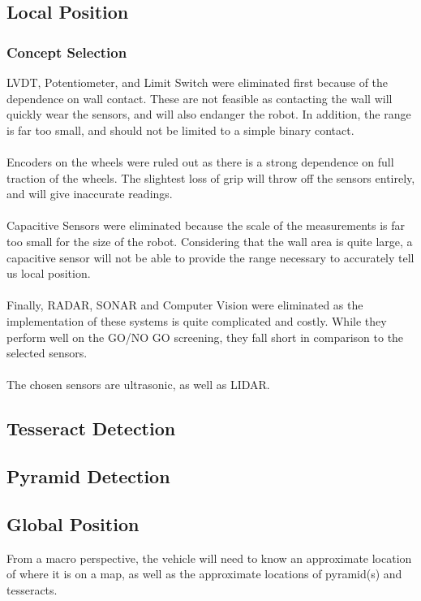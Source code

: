 \documentclass[12pt]{article}
\begin{document}
\subsection{Local Position}
\subsubsection{Concept Selection}
LVDT, Potentiometer, and Limit Switch were eliminated first because of the dependence on wall contact. These are not feasible as contacting the wall will quickly wear the sensors, and will also endanger the robot. In addition, the range is far too small, and should not be limited to a simple binary contact.\\\\
Encoders on the wheels were ruled out as there is a strong dependence on full traction of the wheels. The slightest loss of grip will throw off the sensors entirely, and will give inaccurate readings.\\\\
Capacitive Sensors were eliminated because the scale of the measurements is far too small for the size of the robot. Considering that the wall area is quite large, a capacitive sensor will not be able to provide the range necessary to accurately tell us local position.\\\\
Finally, RADAR, SONAR and Computer Vision were eliminated as the implementation of these systems is quite complicated and costly. While they perform well on the GO/NO GO screening, they fall short in comparison to the selected sensors. \\\\
The chosen sensors are ultrasonic, as well as LIDAR. 


\subsection{Tesseract Detection}


\subsection{Pyramid Detection}
\subsection{Global Position}
From a macro perspective, the vehicle will need to know an approximate location of where it is on a map, as well as the approximate locations of pyramid(s) and tesseracts. 
\end{document}
